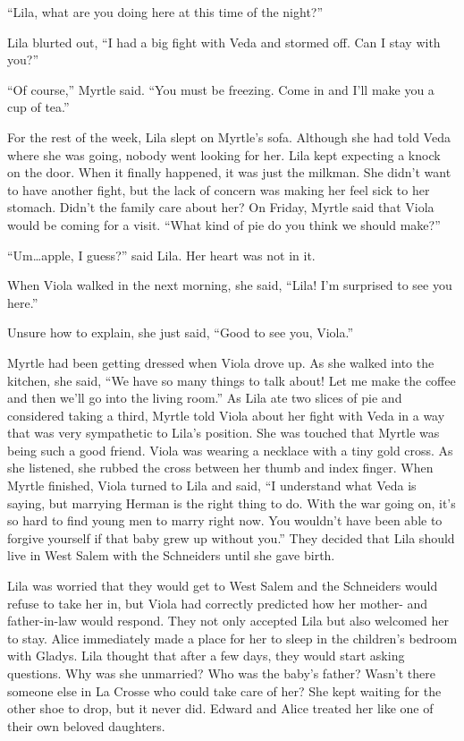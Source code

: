 \documentclass[
  american,
  letterpaper,
]{book}
\begin{document}
``Lila, what are you doing here at this time of the night?''

Lila blurted out, ``I had a big fight with Veda and stormed off. Can I
stay with you?''

``Of course,'' Myrtle said. ``You must be freezing. Come in and I'll
make you a cup of tea.''

For the rest of the week, Lila slept on Myrtle's sofa. Although she had
told Veda where she was going, nobody went looking for her. Lila kept
expecting a knock on the door. When it finally happened, it was just the
milkman. She didn't want to have another fight, but the lack of concern
was making her feel sick to her stomach. Didn't the family care about
her? On Friday, Myrtle said that Viola would be coming for a visit.
``What kind of pie do you think we should make?''

``Um\ldots apple, I guess?'' said Lila. Her heart was not in it.

When Viola walked in the next morning, she said, ``Lila! I'm surprised
to see you here.''

Unsure how to explain, she just said, ``Good to see you, Viola.''

Myrtle had been getting dressed when Viola drove up. As she walked into
the kitchen, she said, ``We have so many things to talk about! Let me
make the coffee and then we'll go into the living room.'' As Lila ate
two slices of pie and considered taking a third, Myrtle told Viola about
her fight with Veda in a way that was very sympathetic to Lila's
position. She was touched that Myrtle was being such a good friend.
Viola was wearing a necklace with a tiny gold cross. As she listened,
she rubbed the cross between her thumb and index finger. When Myrtle
finished, Viola turned to Lila and said, ``I understand what Veda is
saying, but marrying Herman is the right thing to do. With the war going
on, it's so hard to find young men to marry right now. You wouldn't have
been able to forgive yourself if that baby grew up without you.'' They
decided that Lila should live in West Salem with the Schneiders until
she gave birth.

Lila was worried that they would get to West Salem and the Schneiders
would refuse to take her in, but Viola had correctly predicted how her
mother- and father-in-law would respond. They not only accepted Lila but
also welcomed her to stay. Alice immediately made a place for her to
sleep in the children's bedroom with Gladys. Lila thought that after a
few days, they would start asking questions. Why was she unmarried? Who
was the baby's father? Wasn't there someone else in La Crosse who could
take care of her? She kept waiting for the other shoe to drop, but it
never did. Edward and Alice treated her like one of their own beloved
daughters.
\end{document}
